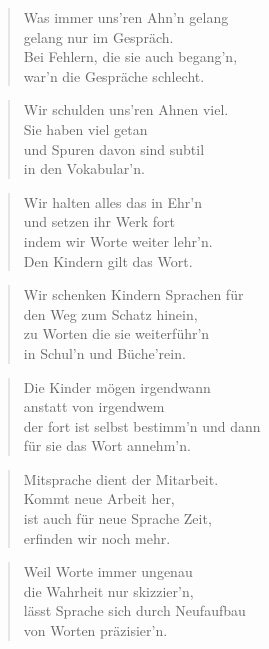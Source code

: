 \documentclass[10pt,a4paper]{article}
\begin{document}
\begin{paracol}{2}
\begin{verse}
Was immer uns’ren Ahn’n gelang \\
gelang nur im Gespräch. \\
Bei Fehlern, die sie auch begang’n, \\
war’n die Gespräche schlecht. \\
\end{verse}

\begin{verse}
Wir schulden uns’ren Ahnen viel. \\
Sie haben viel getan \\
und Spuren davon sind subtil \\
in den Vokabular’n. \\
\end{verse}

\begin{verse}
Wir halten alles das in Ehr’n \\
und setzen ihr Werk fort \\
indem wir Worte weiter lehr’n. \\
Den Kindern gilt das Wort. \\
\end{verse}

\begin{verse}
Wir schenken Kindern Sprachen für \\
den Weg zum Schatz hinein, \\
zu Worten die sie weiterführ’n \\
in Schul’n und Büche’rein. \\
\end{verse}

\begin{verse}
Die Kinder mögen irgendwann \\
anstatt von irgendwem \\
der fort ist selbst bestimm’n und dann \\
für sie das Wort annehm’n. \\
\end{verse}

\begin{verse}
Mitsprache dient der Mitarbeit. \\
Kommt neue Arbeit her, \\
ist auch für neue Sprache Zeit, \\
erfinden wir noch mehr. \\
\end{verse}

\begin{verse}
Weil Worte immer ungenau \\
die Wahrheit nur skizzier’n, \\
lässt Sprache sich durch Neufaufbau \\
von Worten präzisier’n. \\
\end{verse}


\end{paracol}
\end{document}
